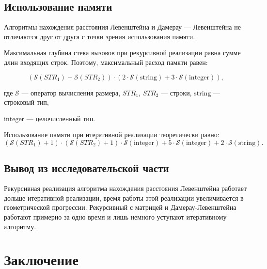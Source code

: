 \documentclass[12pt]{report}
\begin{document}
\section{Использование памяти}

Алгоритмы нахождения расстояния Левенштейна и Дамерау — Левенштейна не отличаются друг от друга с точки зрения использования памяти.

Максимальная глубина стека вызовов при рекурсивной реализации равна сумме длин входящих строк. Поэтому, максимальный расход памяти равен: 

\begin{equation}
(\mathcal{S}(STR_1) + \mathcal{S}(STR_2)) \cdot (2 \cdot \mathcal{S}\mathrm{(string)} + 3 \cdot \mathcal{S}\mathrm{(integer)}),
\end{equation}

\noindent где $\mathcal{S}$ — оператор вычисления размера, $STR_1$, $STR_2$ — строки, $\mathrm{string}$ — строковый тип, 

\noindent $\mathrm{integer}$ — целочисленный тип.

Использование памяти при итеративной реализации теоретически равно:
\begin{equation}
(\mathcal{S}(STR_1) + 1) \cdot (\mathcal{S}(STR_2) + 1) \cdot \mathcal{S}\mathrm{(integer)} + 5\cdot \mathcal{S}\mathrm{(integer)} + 2 \cdot \mathcal{S}\mathrm{(string)}.
\end{equation}


\section{Вывод из исследовательской части}

Рекурсивная реализация алгоритма нахождения расстояния Левенштейна работает дольше итеративной реализации, время работы этой реализации увеличивается в геометрической прогрессии. Рекурсивный с матрицей и Дамерау-Левенштейна работают примерно за одно время и лишь немного уступают итеративному алгоритму.


\chapter*{Заключение}
\end{document}
